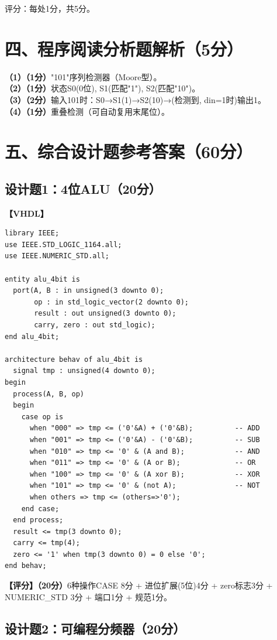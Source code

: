 {\centering 评分：每处1分，共5分。\par}

\section{四、程序阅读分析题解析（5分）}

\textbf{（1）（1分）}"101"序列检测器（Moore型）。\\
\textbf{（2）（1分）}状态S0(0位), S1(匹配"1"), S2(匹配"10")。\\
\textbf{（3）（2分）}输入101时：S0→S1(1)→S2(10)→(检测到, din=1时)输出1。\\
\textbf{（4）（1分）}重叠检测（可自动复用末尾位）。

\section{五、综合设计题参考答案（60分）}

\subsection{设计题1：4位ALU（20分）}

\textbf{【VHDL】}
\begin{lstlisting}
library IEEE;
use IEEE.STD_LOGIC_1164.all;
use IEEE.NUMERIC_STD.all;

entity alu_4bit is
  port(A, B : in unsigned(3 downto 0);
       op : in std_logic_vector(2 downto 0);
       result : out unsigned(3 downto 0);
       carry, zero : out std_logic);
end alu_4bit;

architecture behav of alu_4bit is
  signal tmp : unsigned(4 downto 0);
begin
  process(A, B, op)
  begin
    case op is
      when "000" => tmp <= ('0'&A) + ('0'&B);          -- ADD
      when "001" => tmp <= ('0'&A) - ('0'&B);          -- SUB
      when "010" => tmp <= '0' & (A and B);            -- AND
      when "011" => tmp <= '0' & (A or B);             -- OR
      when "100" => tmp <= '0' & (A xor B);            -- XOR
      when "101" => tmp <= '0' & (not A);              -- NOT
      when others => tmp <= (others=>'0');
    end case;
  end process;
  result <= tmp(3 downto 0);
  carry <= tmp(4);
  zero <= '1' when tmp(3 downto 0) = 0 else '0';
end behav;
\end{lstlisting}

\textbf{【评分】（20分）}6种操作CASE 8分 + 进位扩展(5位)4分 + zero标志3分 + NUMERIC\_STD 3分 + 端口1分 + 规范1分。

\subsection{设计题2：可编程分频器（20分）}

